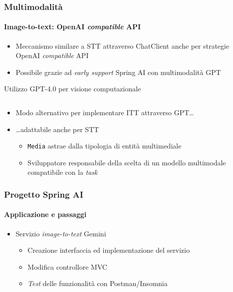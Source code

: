 \begin{frame}[t,fragile] \frametitle{Multimodalità}
\framesubtitle{Image-to-text: OpenAI \textit{compatible} API}
    {\footnotesize
    \begin{itemize}[leftmargin=10pt,align=right]
        \item[\alert{\faArrowCircleRight}] Meccanismo similare a STT attraverso ChatClient anche per strategie OpenAI \textit{compatible} API
        \item[\alert{\faExclamationTriangle}] Possibile grazie ad \textit{early support} Spring AI con multimodalità GPT 
    \end{itemize}
    \begin{block}{Utilizzo GPT-4.0 per visione computazionale}
		{\tiny\inputminted{java}{code/GPTMultimodalityVision.java}}
    \end{block}
    \begin{itemize}[leftmargin=10pt,align=right]
        \item[\alert{\faArrowCircleRight}] Modo alternativo per implementare ITT attraverso GPT\ldots
        \item[\alert{\faArrowCircleRight}] \ldots adattabile anche per STT
        \begin{itemize}[leftmargin=10pt,align=right]
            \item[\alert{\faArrowCircleRight}] \alert{\texttt{Media}} astrae dalla tipologia di entità multimediale
            \item[\alert{\faExclamationTriangle}] Sviluppatore responsabile della scelta di un modello multimodale compatibile con la \textit{task}
        \end{itemize}
    \end{itemize}  
    }
\end{frame}    
%
\begin{frame}[t,fragile] \frametitle{Progetto Spring AI}
    \framesubtitle{Applicazione e passaggi}
    {\small
    \begin{itemize}[leftmargin=10pt,align=right]
        \item[\alert{\faArrowCircleRight}] Servizio \textit{image-to-text} Gemini
        \begin{itemize}[leftmargin=10pt,align=right]
            \item[\alertedcircled{1}] Creazione interfaccia ed implementazione del servizio
            \item[\alertedcircled{2}] Modifica controllore MVC
            \item[\alertedcircled{3}] \textit{Test} delle funzionalità con Postman/Insomnia
        \end{itemize}
    \end{itemize}
    }
\end{frame}

